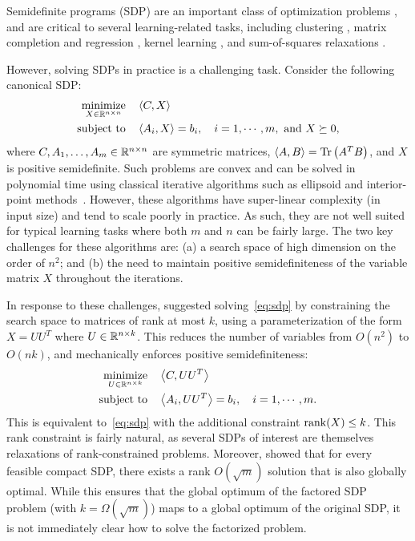 
Semidefinite programs (SDP) are an important class of optimization problems \citep{vandenberghe1996semidefinite}, and are critical to several learning-related tasks, including clustering \citep{shi2000normalized,abbe2017community}, matrix completion and regression \citep{recht2010guaranteed,candes2009exact}, kernel learning \citep{lanckriet2004learning}, and sum-of-squares relaxations \citep{barak2015dictionary}. 

However, solving SDPs in practice is a challenging task. Consider the following  canonical SDP: 
\begin{align}
\underset{X \in \mathbb{R}^{n \times n}}{\operatorname*{\mathrm{minimize}}} \quad & \left\langle C, X \right\rangle \nonumber \\
\text{subject to} \quad & \left\langle A_i, X \right\rangle =b_i,\quad i =1,\cdots, m, \text{ and } X \succeq 0,
\label{eq:sdp}
\end{align}
where $C, A_1, \ldots, A_m \in \mathbb{R}^{n\times n}$ are symmetric matrices, $\left\langle A, B \right\rangle = \mathrm{Tr}\left(A^T B\right)$, and $X$ is positive semidefinite. Such problems are convex and can be solved in polynomial time using classical iterative algorithms such as ellipsoid and interior-point methods~\citep{nesterov1994interior}.  However, these algorithms have super-linear complexity (in input size) and tend to scale poorly in practice. As such, they are not well suited for typical learning tasks where both $m$ and $n$ can be fairly large. The two key challenges for these algorithms are: (a) a search space of high dimension on the order of $n^2$; and (b) the need to maintain positive semidefiniteness of the variable matrix $X$ throughout the iterations. 

In response to these challenges, \citet{burer2003nonlinear, burer2005local} suggested solving~\eqref{eq:sdp} by constraining the search space to matrices of rank at most $k$, using a parameterization of the form $X = UU^T$ where $U \in \mathbb{R}^{n\times k}$. This reduces the number of variables from $O(n^2)$ to $O(nk)$, and mechanically enforces positive semidefiniteness:
\begin{align}
	\underset{U \in \mathbb{R}^{n\times k}}{\operatorname*{\mathrm{minimize}}} \quad & \left\langle C, UU^T \right\rangle \nonumber \\
	\text{subject to} \quad & \left\langle A_i, UU^T \right\rangle = b_i,\quad i = 1,\cdots, m.
	\label{eq:factored}
\end{align}
This is equivalent to~\eqref{eq:sdp} with the additional constraint $\operatorname{rank}(X) \leq k$. This rank constraint is fairly natural, as several SDPs of interest are themselves relaxations of rank-constrained problems. Moreover, \citet{barvinok1995problems, pataki1998rank} showed that for every feasible compact SDP, there exists a rank $O(\sqrt{m})$ solution that is also globally optimal. While this ensures that the global optimum of the factored SDP problem (with $k=\Omega(\sqrt{m})$) maps to a global optimum of the original SDP, it is not immediately clear how to solve the factorized problem. 

